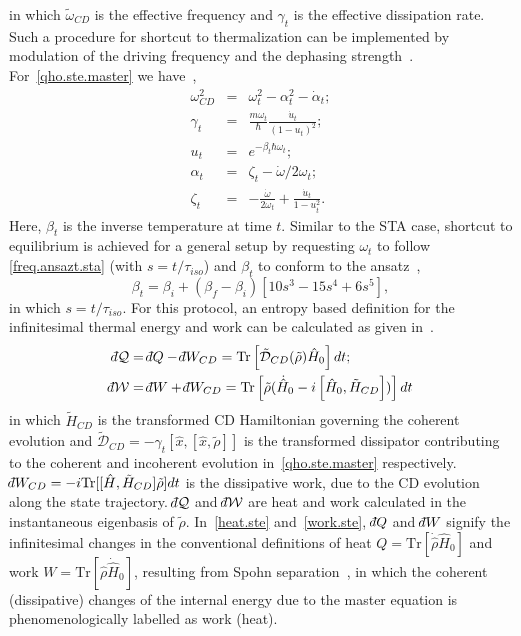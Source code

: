 \documentclass[aps,pra,twocolumn,showpacs,showkeys,groupedaddress,nobalancelastpage,nofootinbib,floatfix,superscriptaddress,longbibliography]{revtex4-2}
\begin{document}
in which $\tilde{\omega}_{CD}$ is the effective frequency and $\gamma_t$ is the effective dissipation rate. Such a procedure for shortcut to thermalization can be implemented by modulation of the driving frequency and the dephasing strength~\cite{Alipour2020shortcutsto,PhysRevResearch.2.033178}. For~\cref{qho.ste.master} we have~\cite{Alipour2020shortcutsto},
\begin{eqnarray}\label{qho.ste.param}
  \omega_{CD}^2 &=& \omega_t^2 - \alpha_t^2 - \dot{\alpha}_t; \\
  \gamma_t &=& \frac{m\omega_t}{\hbar}\frac{\dot{u}_t}{(1-u_t)^2}; \\
   u_t &=& e^{-\beta_t \hbar \omega_t}; \\
   \alpha_t &=& \zeta_t - \dot{\omega}/2\omega_t; \\
   \zeta_t &=& -\frac{\dot{\omega}}{2\omega_t} + \frac{\dot{u}_t}{1-u_t^2}.
\end{eqnarray}
Here, $\beta_t$ is the inverse temperature at time $t$. Similar to the STA case, shortcut to equilibrium is achieved for a general setup by requesting $\omega_t$ to follow \cref{freq.ansazt.sta} (with $s=t/\tau_{iso}$) and $\beta_t$ to conform to the ansatz~\cite{Alipour2020shortcutsto},
\begin{equation}\label{beta.ansazt.ste}
   \beta_t = \beta_i + (\beta_f - \beta_i)[10s^3-15s^4+6s^5],
\end{equation}
in which $s=t/\tau_{iso}$. For this protocol, an entropy based definition for the infinitesimal thermal energy and work can be calculated as given in~\cite{PhysRevA.105.L040201}.
\begin{align}
    \dbar\mathcal{Q} &= \dbar Q - \dbar W_{CD} = \text{Tr}\left[\tilde{\mathcal{D}}_{CD}(\tilde{\rho}) \hat{H}_0 \right]dt;\label{heat.ste}\\
    \dbar\mathcal{W} &= \dbar W + \dbar W_{CD} = \text{Tr}\left[\tilde{\rho}(\dot{\hat{H}}_0-i\left[\hat{H}_0,\tilde{H}_{CD} \right]) \right]dt\label{work.ste}
\end{align}
in which $\tilde{H}_{CD}$ is the transformed CD Hamiltonian governing the coherent evolution and $\tilde{\mathcal{D}}_{CD}=-\gamma_t \left[\hat{x},\left[\hat{x},\tilde{\rho}\right]\right]$ is the transformed dissipator contributing to the coherent and incoherent evolution in~\cref{qho.ste.master} respectively. $\dbar W_{CD}=-i\text{Tr}[[\hat{H},\tilde{H}_{CD}] \tilde{\rho}]dt$ is the dissipative work, due to the CD evolution along the state trajectory. $\dbar\mathcal{Q}$ and $\dbar\mathcal{W}$ are heat and work calculated in the instantaneous eigenbasis of $\tilde{\rho}$. In~\cref{heat.ste} and~\cref{work.ste}, $\dbar Q$ and $\dbar W$ signify the infinitesimal changes in the conventional definitions of heat $Q=\text{Tr}[\dot{\hat{\rho}}\hat{H}_0]$ and work $W=\text{Tr}[\hat{\rho}\dot{\hat{H}}_0]$, resulting from Spohn separation~\cite{10.1063/1.523789}, in which the coherent (dissipative) changes of the internal energy due to the master equation is phenomenologically labelled as work (heat).\\
\end{document}
